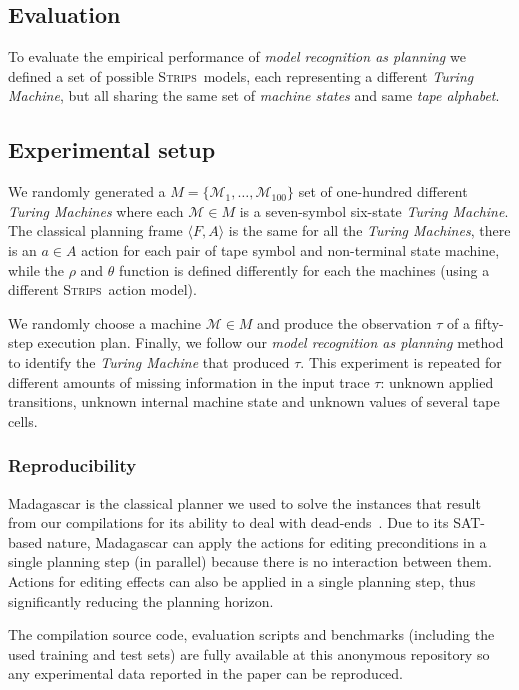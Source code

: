 \documentclass[letterpaper]{article} %
\newcommand{\tup}[1]{{\langle #1 \rangle}}
\newcommand{\strips}{\textsc{Strips}}     %
\begin{document}
\subsection{Evaluation}
\label{sec:evaluation}
To evaluate the empirical performance of {\em model recognition as planning} we defined a set of possible \strips\ models, each representing a different {\em Turing Machine}, but all sharing the same set of {\em machine states} and same {\em tape alphabet}.

\subsection{Experimental setup}
We randomly generated a $M=\{\mathcal{M}_1,\ldots,\mathcal{M}_{100}\}$ set of one-hundred different {\em Turing Machines} where each $\mathcal{M}\in M$ is a seven-symbol six-state {\em Turing Machine}. The classical planning frame $\tup{F,A}$ is the same for all the {\em Turing Machines}, there is an $a\in A$ action for each pair of tape symbol and non-terminal state machine, while the $\rho$ and $\theta$ function is defined differently for each the machines (using a different \strips\ action model).

We randomly choose a machine $\mathcal{M}\in M$ and produce the observation $\tau$ of a fifty-step execution plan. Finally, we follow our {\em model recognition as planning} method to identify the {\em Turing Machine} that produced $\tau$. This experiment is repeated for different amounts of missing information in the input trace $\tau$: unknown applied transitions, unknown internal machine state and unknown values of several tape cells.

\subsubsection{Reproducibility}
{\sc Madagascar} is the classical planner we used to solve the instances that result from our compilations for its ability to deal with dead-ends~\cite{rintanen2014madagascar}. Due to its SAT-based nature, {\sc Madagascar} can apply the actions for editing preconditions in a single planning step (in parallel) because there is no interaction between them. Actions for editing effects can also be applied in a single planning step, thus significantly reducing the planning horizon.

The compilation source code, evaluation scripts and benchmarks (including the used training and test sets) are fully available at this anonymous repository {\em } so any experimental data reported in the paper can be reproduced.
\end{document}

